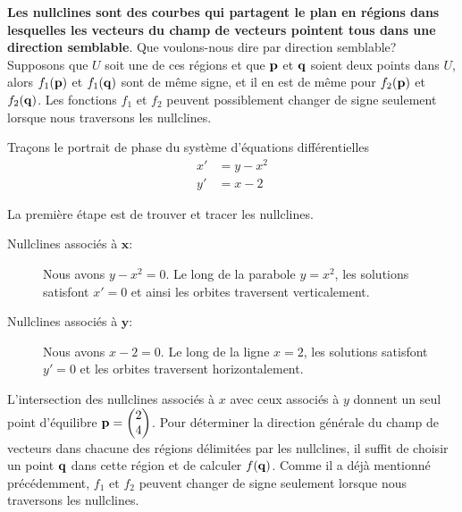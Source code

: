 {{\bfseries Les nullclines sont des courbes qui partagent le plan en
régions dans lesquelles les vecteurs du champ de vecteurs pointent
tous dans une \flqq direction semblable\frqq}.  Que voulons-nous dire par
\flqq direction semblable\frqq?  Supposons que $U$ soit une de ces régions et
que $\mathbf{p}$ et $\mathbf{q}$ soient deux points dans $U$, alors
$f_1(\mathbf{p})$ et $f_1(\mathbf{q})$ sont de même signe, et il en est de
même pour $f_2(\mathbf{p})$ et $f_2(\mathbf{q})$. Les fonctions
$f_1$ et $f_2$ peuvent possiblement changer de signe seulement lorsque
nous traversons les nullclines.

\begin{egg}
Traçons le portrait de phase du système d'équations différentielles 
\begin{equation} \label{GL_ex1}
\begin{split}
x' &= y - x^2 \\
y' &= x - 2
\end{split}
\end{equation}

La première étape est de trouver et tracer les nullclines.
\begin{description}
\item[Nullclines associés à $\mathbf x$:] Nous avons $y-x^2 = 0$.  Le long
  de la parabole $y=x^2$, les solutions satisfont $x' = 0$ et
  ainsi les orbites traversent verticalement.
\item[Nullclines associés à $\mathbf y$:] Nous avons $x-2=0$.  Le long de la
  ligne $x=2$, les solutions satisfont $y' = 0$ et les orbites
  traversent horizontalement.
\end{description}
L'intersection des nullclines associés à $x$ avec ceux associés à $y$
donnent un seul point d'équilibre
$\displaystyle \mathbf{p} = \begin{pmatrix} 2 \\ 4 \end{pmatrix}$.
Pour déterminer la direction générale du champ de vecteurs dans
chacune des régions délimitées par les nullclines, il suffit de
choisir un point $\mathbf{q}$ dans cette région et de calculer
$f(\mathbf{q})$.   Comme il a déjà mentionné précédemment, 
$f_1$ et $f_2$ peuvent changer de signe seulement lorsque nous
traversons les nullclines.


\end{egg}}
